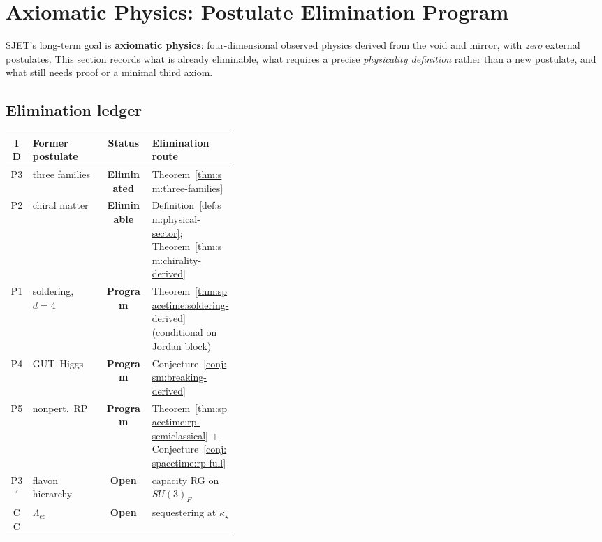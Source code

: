 \section{Axiomatic Physics: Postulate Elimination Program}
\label{sec:axiomatic}

SJET's long-term goal is \textbf{axiomatic physics}: four-dimensional
observed physics derived from the void and mirror, with \emph{zero} external
postulates. This section records what is already eliminable, what requires a
precise \emph{physicality definition} rather than a new postulate, and what
still needs proof or a minimal third axiom.

\subsection{Elimination ledger}
\label{sec:axiomatic:ledger}

\begin{center}
\small
\renewcommand{\arraystretch}{1.12}
\begin{tabular}{@{}clcp{0.38\linewidth}@{}}
\toprule
\textbf{ID} & \textbf{Former postulate} & \textbf{Status} & \textbf{Elimination route} \\
\midrule
P3 & three families & \textbf{Eliminated} & Theorem~\ref{thm:sm:three-families} \\
P2 & chiral matter & \textbf{Eliminable} & Definition~\ref{def:sm:physical-sector};
  Theorem~\ref{thm:sm:chirality-derived} \\
P1 & soldering, $d=4$ & \textbf{Program} & Theorem~\ref{thm:spacetime:soldering-derived}
  (conditional on Jordan block) \\
P4 & GUT--Higgs & \textbf{Program} & Conjecture~\ref{conj:sm:breaking-derived} \\
P5 & nonpert.\ RP & \textbf{Program} & Theorem~\ref{thm:spacetime:rp-semiclassical}
  + Conjecture~\ref{conj:spacetime:rp-full} \\
P3$'$ & flavon hierarchy & \textbf{Open} & capacity RG on $SU(3)_F$ \\
CC & $\Lambda_{\mathrm{cc}}$ & \textbf{Open} & sequestering at $\kappa_\star$ \\
\bottomrule
\end{tabular}
\end{center}

